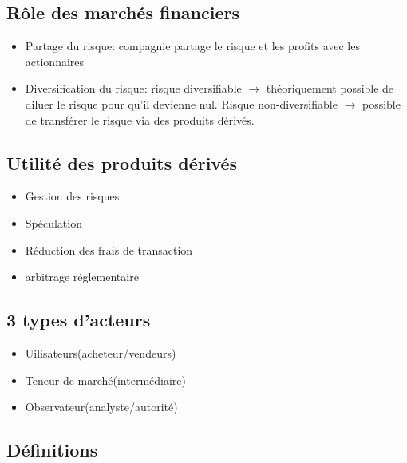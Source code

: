 \subsection*{Rôle des marchés financiers}\label{role-des-marches-financiers}

\begin{itemize}

\item
  Partage du risque: compagnie partage le risque et les profits avec les
  actionnaires
\item
  Diversification du risque: risque diversifiable \(\rightarrow\)
  théoriquement possible de diluer le risque pour qu'il devienne nul.
  Risque non-diversifiable \(\rightarrow\) possible de transférer le
  risque via des produits dérivés.
\end{itemize}

\subsection*{Utilité des produits dérivés}\label{utilite-des-produits-derives}

\begin{itemize}

\item
  Gestion des risques
\item
  Spéculation
\item
  Réduction des frais de transaction
\item
  arbitrage réglementaire
\end{itemize}

\subsection*{3 types d'acteurs}\label{types-dacteurs}

\begin{itemize}

\item
  Uilisateurs(acheteur/vendeurs)
\item
  Teneur de marché(intermédiaire)
\item
  Observateur(analyste/autorité)
\end{itemize}

\subsection*{Définitions}\label{definitions-1}

